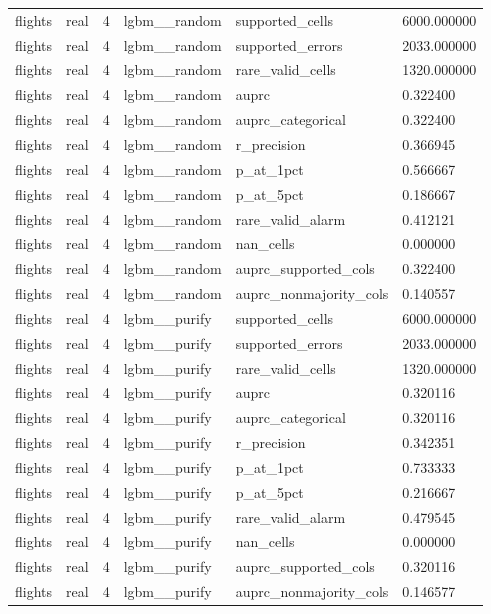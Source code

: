 \begin{tabular}{llllll}
flights & real & 4 & lgbm\_\_random & supported\_cells & 6000.000000 \\
flights & real & 4 & lgbm\_\_random & supported\_errors & 2033.000000 \\
flights & real & 4 & lgbm\_\_random & rare\_valid\_cells & 1320.000000 \\
flights & real & 4 & lgbm\_\_random & auprc & 0.322400 \\
flights & real & 4 & lgbm\_\_random & auprc\_categorical & 0.322400 \\
flights & real & 4 & lgbm\_\_random & r\_precision & 0.366945 \\
flights & real & 4 & lgbm\_\_random & p\_at\_1pct & 0.566667 \\
flights & real & 4 & lgbm\_\_random & p\_at\_5pct & 0.186667 \\
flights & real & 4 & lgbm\_\_random & rare\_valid\_alarm & 0.412121 \\
flights & real & 4 & lgbm\_\_random & nan\_cells & 0.000000 \\
flights & real & 4 & lgbm\_\_random & auprc\_supported\_cols & 0.322400 \\
flights & real & 4 & lgbm\_\_random & auprc\_nonmajority\_cols & 0.140557 \\
flights & real & 4 & lgbm\_\_purify & supported\_cells & 6000.000000 \\
flights & real & 4 & lgbm\_\_purify & supported\_errors & 2033.000000 \\
flights & real & 4 & lgbm\_\_purify & rare\_valid\_cells & 1320.000000 \\
flights & real & 4 & lgbm\_\_purify & auprc & 0.320116 \\
flights & real & 4 & lgbm\_\_purify & auprc\_categorical & 0.320116 \\
flights & real & 4 & lgbm\_\_purify & r\_precision & 0.342351 \\
flights & real & 4 & lgbm\_\_purify & p\_at\_1pct & 0.733333 \\
flights & real & 4 & lgbm\_\_purify & p\_at\_5pct & 0.216667 \\
flights & real & 4 & lgbm\_\_purify & rare\_valid\_alarm & 0.479545 \\
flights & real & 4 & lgbm\_\_purify & nan\_cells & 0.000000 \\
flights & real & 4 & lgbm\_\_purify & auprc\_supported\_cols & 0.320116 \\
flights & real & 4 & lgbm\_\_purify & auprc\_nonmajority\_cols & 0.146577 \\

\end{tabular}
